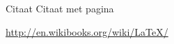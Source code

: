 Citaat \cite{MScBuijs2010}
Citaat met pagina \cite[p.~10]{MScNugteren2010}

\url{http://en.wikibooks.org/wiki/LaTeX/}